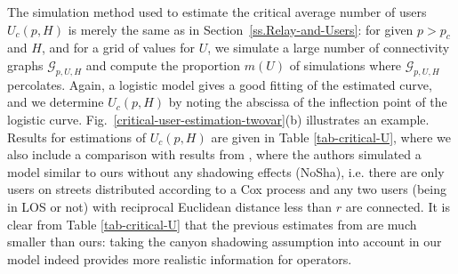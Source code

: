 \documentclass[conference]{IEEEtran}
\begin{document}
\indent The simulation method used to estimate the critical average number of users $U_{c}(p,H)$ is merely the same as in Section~\ref{ss.Relay-and-Users}: for given $p>p_c$ and $H$, and for a grid of values for $U$, we simulate a large number of connectivity graphs $\mathcal{G}_{p,U,H}$ and compute the proportion $m(U)$ of simulations where $\mathcal{G}_{p,U,H}$ percolates. Again, a logistic model gives a good fitting of the estimated curve, and we determine $U_{c}(p,H)$ by noting the abscissa of the inflection point of the logistic curve. Fig.~\ref{critical-user-estimation-twovar}(b) illustrates an example. Results for estimations of $U_c(p,H)$ are given in Table \ref{tab-critical-U}, where we also include a comparison with results from \cite{cali2018percolation}, where the authors simulated a model similar to ours without any shadowing effects (NoSha), i.e. there are only users on streets distributed according to a Cox process and any two users (being in LOS or not) with reciprocal Euclidean distance less than $r$ are connected. It is clear from Table \ref{tab-critical-U} that the previous estimates from \cite{cali2018percolation} are much smaller than ours: taking the canyon shadowing assumption into account in our model indeed provides more realistic information for operators.


\end{document}
